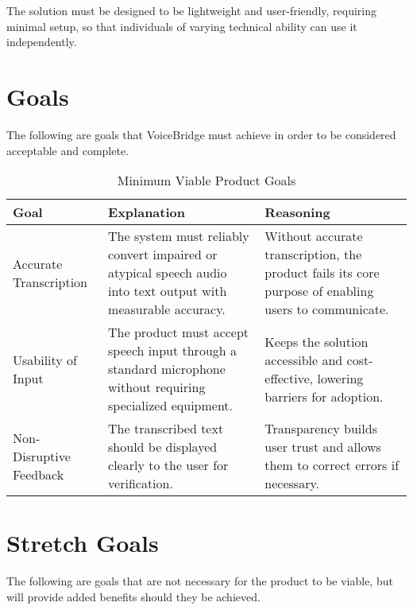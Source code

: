 \documentclass{article}
\begin{document}
The solution must be designed to be lightweight and user-friendly, requiring minimal setup, so that individuals of varying technical ability can use it independently.


\section{Goals}
The following are goals that VoiceBridge must achieve in order to be considered acceptable and complete.

\begin{table}[hp]
\caption{Minimum Viable Product Goals} 
\begin{tabularx}{\textwidth}{lXX} \\[-8pt]
\toprule
\textbf{Goal} & \textbf{Explanation} & \textbf{Reasoning}\\
\midrule
Accurate Transcription & The system must reliably convert impaired or atypical speech audio into text output with measurable accuracy. & Without accurate transcription, the product fails its core purpose of enabling users to communicate.\\
Usability of Input & The product must accept speech input through a standard microphone without requiring specialized equipment. & Keeps the solution accessible and cost-effective, lowering barriers for adoption.\\
Non-Disruptive Feedback & The transcribed text should be displayed clearly to the user for verification. & Transparency builds user trust and allows them to correct errors if necessary.\\
\bottomrule
\end{tabularx}
\end{table}

\section{Stretch Goals}
The following are goals that are not necessary for the product to be viable, but will provide added benefits should they be achieved.
\end{document}

